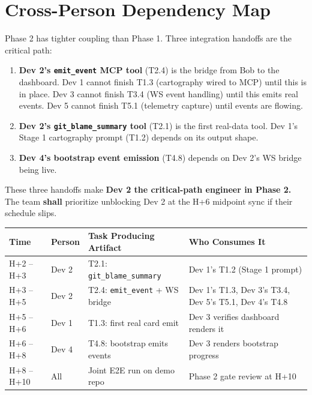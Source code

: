 \documentclass[11pt,letterpaper]{article}
\newcommand{\shall}{\textbf{shall}}
\begin{document}
\section{Cross-Person Dependency Map}

Phase 2 has tighter coupling than Phase 1. Three integration handoffs are the critical path:

\begin{enumerate}
  \item \textbf{Dev 2's \texttt{emit\_event} MCP tool} (T2.4) is the bridge from Bob to the dashboard. Dev 1 cannot finish T1.3 (cartography wired to MCP) until this is in place. Dev 3 cannot finish T3.4 (WS event handling) until this emits real events. Dev 5 cannot finish T5.1 (telemetry capture) until events are flowing.
  \item \textbf{Dev 2's \texttt{git\_blame\_summary} tool} (T2.1) is the first real-data tool. Dev 1's Stage 1 cartography prompt (T1.2) depends on its output shape.
  \item \textbf{Dev 4's bootstrap event emission} (T4.8) depends on Dev 2's WS bridge being live.
\end{enumerate}

These three handoffs make \textbf{Dev 2 the critical-path engineer in Phase 2.} The team \shall{} prioritize unblocking Dev 2 at the H+6 midpoint sync if their schedule slips.

\begin{longtable}{|p{1.4cm}|p{2.4cm}|p{3.4cm}|p{6cm}|}
\hline
\rowcolor{ibmblue!10}
\textbf{Time} & \textbf{Person} & \textbf{Task Producing Artifact} & \textbf{Who Consumes It} \\
\hline
H+2 -- H+3 & Dev 2 & T2.1: \texttt{git\_blame\_summary} & Dev 1's T1.2 (Stage 1 prompt) \\
\hline
H+3 -- H+5 & Dev 2 & T2.4: \texttt{emit\_event} + WS bridge & Dev 1's T1.3, Dev 3's T3.4, Dev 5's T5.1, Dev 4's T4.8 \\
\hline
H+5 -- H+6 & Dev 1 & T1.3: first real card emit & Dev 3 verifies dashboard renders it \\
\hline
H+6 -- H+8 & Dev 4 & T4.8: bootstrap emits events & Dev 3 renders bootstrap progress \\
\hline
H+8 -- H+10 & All & Joint E2E run on demo repo & Phase 2 gate review at H+10 \\
\hline
\end{longtable}
\end{document}
